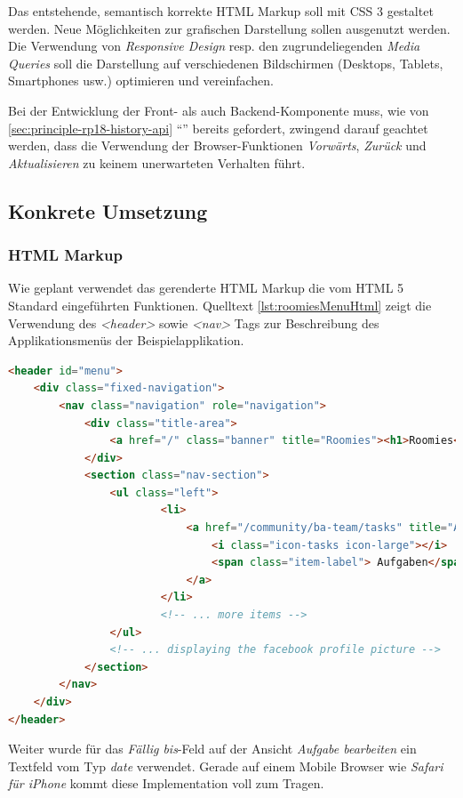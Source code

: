 Das entstehende, semantisch korrekte HTML Markup soll mit CSS 3 gestaltet werden. Neue Möglichkeiten zur grafischen Darstellung sollen ausgenutzt werden. Die Verwendung von \emph{Responsive Design} resp. den zugrundeliegenden \emph{Media Queries} \cite{css-mediaquery} soll die  Darstellung auf verschiedenen Bildschirmen (Desktops, Tablets, Smartphones usw.) optimieren und vereinfachen.

Bei der Entwicklung der Front- als auch Backend-Komponente muss, wie von \ref{sec:principle-rp18-history-api} ``'' bereits gefordert, zwingend darauf geachtet werden, dass die Verwendung der Browser-Funktionen \emph{Vorwärts}, \emph{Zurück} und \emph{Aktualisieren} zu keinem unerwarteten Verhalten führt.

\subsection*{Konkrete Umsetzung}

\subsubsection*{HTML Markup}

Wie geplant verwendet das gerenderte HTML Markup die vom HTML 5 Standard eingeführten Funktionen. Quelltext \ref{lst:roomiesMenuHtml} zeigt die Verwendung des \emph{<header>} sowie \emph{<nav>} Tags zur Beschreibung des Applikationsmenüs der Beispielapplikation.

\begin{lstlisting}[language=HTML, caption={Ausschnitt des gerenderten HTML Markups der Menüleiste \emph{Roomies}}, label={lst:roomiesMenuHtml}]
<header id="menu">
	<div class="fixed-navigation">
		<nav class="navigation" role="navigation">
			<div class="title-area">
				<a href="/" class="banner" title="Roomies"><h1>Roomies</h1></a>
			</div>
			<section class="nav-section">
				<ul class="left">
						<li>
							<a href="/community/ba-team/tasks" title="Aufgaben">
								<i class="icon-tasks icon-large"></i>
								<span class="item-label"> Aufgaben</span>
							</a>
						</li>
						<!-- ... more items -->
				</ul>
				<!-- ... displaying the facebook profile picture -->
			</section>
		</nav>
	</div>
</header>
\end{lstlisting}

Weiter wurde für das \emph{Fällig bis}-Feld auf der Ansicht \emph{Aufgabe bearbeiten} ein Textfeld vom Typ \emph{date} verwendet. Gerade auf einem Mobile Browser wie \emph{Safari für iPhone} kommt diese Implementation voll zum Tragen.

